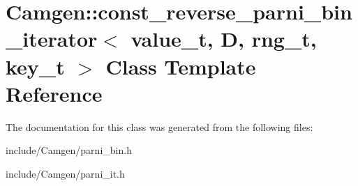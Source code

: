\hypertarget{a00104}{\section{Camgen\-:\-:const\-\_\-reverse\-\_\-parni\-\_\-bin\-\_\-iterator$<$ value\-\_\-t, D, rng\-\_\-t, key\-\_\-t $>$ Class Template Reference}
\label{a00104}
}


The documentation for this class was generated from the following files\-:\begin{DoxyCompactItemize}
\item 
include/\-Camgen/parni\-\_\-bin.\-h\item 
include/\-Camgen/parni\-\_\-it.\-h\end{DoxyCompactItemize}

